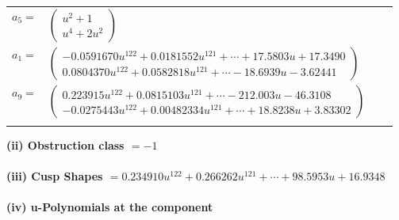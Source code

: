 \documentclass[1p]{elsarticle_modified}
\theoremstyle{definition}
\begin{document}
\begin{tabular}{m{7pt} m{180pt} m{7pt} m{180pt} }
\flushright $a_{5}=$&$\begin{pmatrix}u^2+1\\u^4+2 u^2\end{pmatrix}$ \\
\flushright $a_{1}=$&$\begin{pmatrix}-0.0591670 u^{122}+0.0181552 u^{121}+\cdots+17.5803 u+17.3490\\0.0804370 u^{122}+0.0582818 u^{121}+\cdots-18.6939 u-3.62441\end{pmatrix}$ \\
\flushright $a_{9}=$&$\begin{pmatrix}0.223915 u^{122}+0.0815103 u^{121}+\cdots-212.003 u-46.3108\\-0.0275443 u^{122}+0.00482334 u^{121}+\cdots+18.8238 u+3.83302\end{pmatrix}$\\&\end{tabular}
\flushleft \textbf{(ii) Obstruction class $= -1$}\\~\\
\flushleft \textbf{(iii) Cusp Shapes $= 0.234910 u^{122}+0.266262 u^{121}+\cdots+98.5953 u+16.9348$}\\~\\
\newpage\renewcommand{\arraystretch}{1}
\flushleft \textbf{(iv) u-Polynomials at the component}\newline \\
\end{document}

